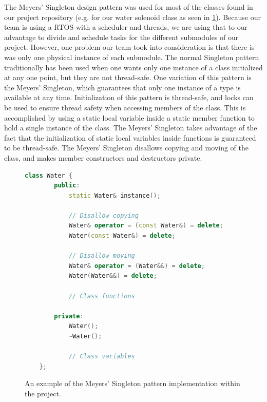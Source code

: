 \documentclass[journal]{IEEEtran}
\begin{document}
The Meyers' Singleton design pattern was used for most of the classes found in our project repository (e.g. for our water solenoid class as seen in \ref{fig:singleton_implementation}). Because our team is using a RTOS with a scheduler and threads, we are using that to our advantage to divide and schedule tasks for the different submodules of our project. However, one problem our team took into consideration is that there is was only one physical instance of each submodule. The normal Singleton pattern traditionally has been used when one wants only one instance of a class initialized at any one point, but they are not thread-safe. One variation of this pattern is the Meyers' Singleton, which guarantees that only one instance of a type is available at any time. Initialization of this pattern is thread-safe, and locks can be used to ensure thread safety when accessing members of the class. This is accomplished by using a static local variable inside a static member function to hold a single instance of the class. The Meyers' Singleton takes advantage of the fact that the initialization of static local variables inside functions is guaranteed to be thread-safe. The Meyers' Singleton disallows copying and moving of the class, and makes member constructors and destructors private.

\lstset{style=mystyle}

\begin{figure}
    \centering
    \label{fig:singleton_implementation}

\begin{lstlisting}[language=C++]
    class Water { 
        public:
            static Water& instance();

            // Disallow copying
            Water& operator = (const Water&) = delete;
            Water(const Water&) = delete;

            // Disallow moving
            Water& operator = (Water&&) = delete;
            Water(Water&&) = delete;

            // Class functions
        
        private:
            Water();
            ~Water();

            // Class variables
    };
\end{lstlisting}
\caption{An example of the Meyers' Singleton pattern implementation within the project.}
\end{figure}
\end{document}
